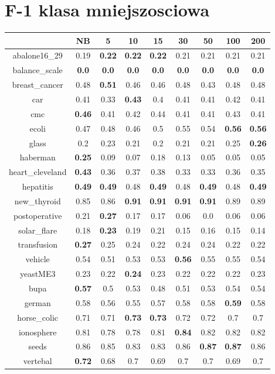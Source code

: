 \documentclass{article}%
\begin{document}
%
\section*{F{-}1 klasa mniejszosciowa}%
\begin{tabular}{c|cccccccc}%
\hline%
&NB&5&10&15&30&50&100&200\\%
\hline%
abalone16\_29&0.19&\textbf{0.22}&\textbf{0.22}&\textbf{0.22}&0.21&0.21&0.21&0.21\\%
\hline%
balance\_scale&\textbf{0.0}&\textbf{0.0}&\textbf{0.0}&\textbf{0.0}&\textbf{0.0}&\textbf{0.0}&\textbf{0.0}&\textbf{0.0}\\%
\hline%
breast\_cancer&0.48&\textbf{0.51}&0.46&0.46&0.48&0.43&0.48&0.48\\%
\hline%
car&0.41&0.33&\textbf{0.43}&0.4&0.41&0.41&0.42&0.41\\%
\hline%
cmc&\textbf{0.46}&0.41&0.42&0.44&0.41&0.41&0.43&0.41\\%
\hline%
ecoli&0.47&0.48&0.46&0.5&0.55&0.54&\textbf{0.56}&\textbf{0.56}\\%
\hline%
glass&0.2&0.23&0.21&0.2&0.21&0.21&0.25&\textbf{0.26}\\%
\hline%
haberman&\textbf{0.25}&0.09&0.07&0.18&0.13&0.05&0.05&0.05\\%
\hline%
heart\_cleveland&\textbf{0.43}&0.36&0.37&0.38&0.33&0.33&0.36&0.35\\%
\hline%
hepatitis&\textbf{0.49}&\textbf{0.49}&0.48&\textbf{0.49}&0.48&\textbf{0.49}&0.48&\textbf{0.49}\\%
\hline%
new\_thyroid&0.85&0.86&\textbf{0.91}&\textbf{0.91}&\textbf{0.91}&\textbf{0.91}&0.89&0.89\\%
\hline%
postoperative&0.21&\textbf{0.27}&0.17&0.17&0.06&0.0&0.06&0.06\\%
\hline%
solar\_flare&0.18&\textbf{0.23}&0.19&0.21&0.15&0.16&0.15&0.14\\%
\hline%
transfusion&\textbf{0.27}&0.25&0.24&0.22&0.24&0.24&0.22&0.22\\%
\hline%
vehicle&0.54&0.51&0.53&0.53&\textbf{0.56}&0.55&0.55&0.54\\%
\hline%
yeastME3&0.23&0.22&\textbf{0.24}&0.23&0.22&0.22&0.22&0.23\\%
\hline%
bupa&\textbf{0.57}&0.5&0.53&0.48&0.51&0.53&0.54&0.54\\%
\hline%
german&0.58&0.56&0.55&0.57&0.58&0.58&\textbf{0.59}&0.58\\%
\hline%
horse\_colic&0.71&0.71&\textbf{0.73}&\textbf{0.73}&0.72&0.72&0.7&0.7\\%
\hline%
ionosphere&0.81&0.78&0.78&0.81&\textbf{0.84}&0.82&0.82&0.82\\%
\hline%
seeds&0.86&0.85&0.83&0.83&0.86&\textbf{0.87}&\textbf{0.87}&0.86\\%
\hline%
vertebal&\textbf{0.72}&0.68&0.7&0.69&0.7&0.7&0.69&0.7\\%
\hline%
\end{tabular}
\end{document}
